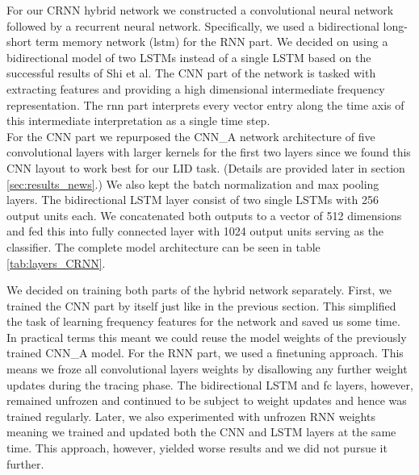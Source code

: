 For our CRNN hybrid network we constructed a convolutional neural network followed by a recurrent neural network. Specifically, we used a bidirectional long-short term memory network (\ac{lstm}) for the RNN part. We decided on using a bidirectional model of two LSTMs instead of a single LSTM based on the successful results of Shi et al\cite{shi2016end}. The CNN part of the network is tasked with extracting features and providing a high dimensional intermediate frequency representation. The \ac{rnn} part interprets every vector entry along the time axis of this intermediate interpretation as a single time step.\\
For the CNN part we repurposed the CNN\_A network architecture of five convolutional layers with larger kernels for the first two layers since we found this CNN layout to work best for our LID task. (Details are provided later in section \ref{sec:results_news}.) We also kept the batch normalization and max pooling layers. The bidirectional LSTM layer consist of two single LSTMs with 256 output units each. We concatenated both outputs to a vector of 512 dimensions and fed this into fully connected layer with 1024 output units serving as the classifier. The complete model architecture can be seen in table \ref{tab:layers_CRNN}. 

We decided on training both parts of the hybrid network separately. First, we trained the CNN part by itself just like in the previous section. This simplified the task of learning frequency features for the network and saved us some time. In practical terms this meant we could reuse the model weights of the previously trained CNN\_A model. For the RNN part, we used a finetuning approach. This means we froze all convolutional layers weights by disallowing any further weight updates during the tracing phase. The bidirectional LSTM and \ac{fc} layers, however, remained unfrozen and continued to be subject to weight updates and hence was trained regularly. Later, we also experimented with unfrozen RNN weights meaning we trained and updated both the CNN and LSTM layers at the same time. This approach, however, yielded worse results and we did not pursue it further.

